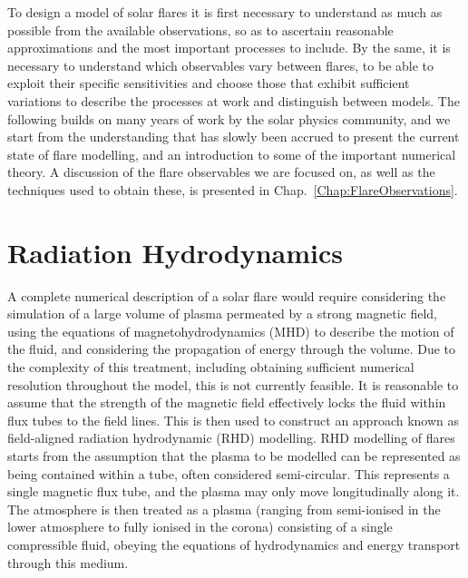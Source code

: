 
To design a model of solar flares it is first necessary to understand as much as possible from the available observations, so as to ascertain reasonable approximations and the most important processes to include.
By the same, it is necessary to understand which observables vary between flares, to be able to exploit their specific sensitivities and choose those that exhibit sufficient variations to describe the processes at work and distinguish between models.
The following builds on many years of work by the solar physics community, and we start from the understanding that has slowly been accrued to present the current state of flare modelling, and an introduction to some of the important numerical theory.
A discussion of the flare observables we are focused on, as well as the techniques used to obtain these, is presented in Chap.~\ref{Chap:FlareObservations}.

\section{Radiation Hydrodynamics}

A complete numerical description of a solar flare would require considering the simulation of a large volume of plasma permeated by a strong magnetic field, using the equations of magnetohydrodynamics (MHD) to describe the motion of the fluid, and considering the propagation of energy through the volume.
Due to the complexity of this treatment, including obtaining sufficient numerical resolution throughout the model, this is not currently feasible.
It is reasonable to assume that the strength of the magnetic field effectively locks the fluid within flux tubes to the field lines.
This is then used to construct an approach known as field-aligned radiation hydrodynamic (RHD) modelling.
RHD modelling of flares starts from the assumption that the plasma to be modelled can be represented as being contained within a tube, often considered semi-circular.
This represents a single magnetic flux tube, and the plasma may only move longitudinally along it.
The atmosphere is then treated as a plasma (ranging from semi-ionised in the lower atmosphere to fully ionised in the corona) consisting of a single compressible fluid, obeying the equations of hydrodynamics and energy transport through this medium.

